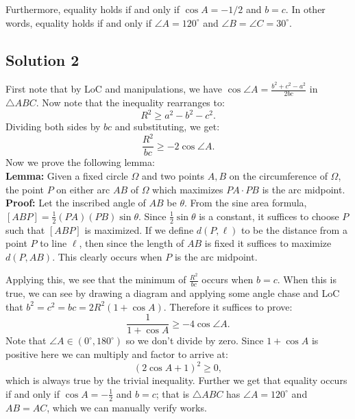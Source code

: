 \documentclass[mast]{lucky}
\begin{document}
Furthermore, equality holds if and only if $\cos A = -1/2$ and $b = c$. In other words, equality holds if and only if $\angle A = 120^\circ$ and $\angle B = \angle C = 30^\circ$.

\subsection{Solution 2}

First note that by LoC and manipulations, we have $\cos \angle A=\frac{b^2+c^2-a^2}{2bc}$ in $\triangle ABC$. Now note that the inequality rearranges to:
$$R^2 \geq a^2-b^2-c^2.$$
Dividing both sides by $bc$ and substituting, we get:
$$\frac{R^2}{bc} \geq -2\cos \angle A.$$
Now we prove the following lemma:\\

\noindent\textbf{Lemma:} Given a fixed circle $\Omega$ and two points $A,B$ on the circumference of $\Omega$, the point $P$ on either arc $AB$ of $\Omega$ which maximizes $PA \cdot PB$ is the arc midpoint.\\
\textbf{Proof:} Let the inscribed angle of $AB$ be $\theta$. From the sine area formula, $[ABP]=\frac{1}{2}(PA)(PB)\sin \theta$. Since $\frac{1}{2}\sin \theta$ is a constant, it suffices to choose $P$ such that $[ABP]$ is maximized. If we define $d(P,\ell)$ to be the distance from a point $P$ to line $\ell$, then since the length of $AB$ is fixed it suffices to maximize $d(P,AB)$. This clearly occurs when $P$ is the arc midpoint.

Applying this, we see that the minimum of $\frac{R^2}{bc}$ occurs when $b=c$. When this is true, we can see by drawing a diagram and applying some angle chase and LoC that $b^2=c^2=bc=2R^2(1+\cos A)$. Therefore it suffices to prove:
$$\frac{1}{1+\cos A} \geq -4\cos \angle A.$$
Note that $\angle A \in (0^\circ,180^\circ)$ so we don't divide by zero. Since $1+\cos A$ is positive here we can multiply and factor to arrive at:
$$(2\cos A+1)^2 \geq 0,$$
which is always true by the trivial inequality. Further we get that equality occurs if and only if $\cos A=-\frac{1}{2}$ and $b=c$; that is $\triangle ABC$ has $\angle A=120^\circ$ and $AB=AC$, which we can manually verify works.
\end{document}
